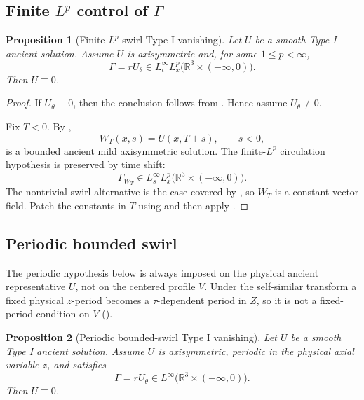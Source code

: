 \documentclass[11pt]{amsart}
\theoremstyle{plain}
\newtheorem{proposition}[proposition]{Proposition}
\theoremstyle{definition}
\theoremstyle{remark}
\numberwithin{equation}{section}
\begin{document}
\subsection{\texorpdfstring{Finite \(L^p\) control of \(\Gamma\)}
{Finite Lp control of Gamma}}

\begin{proposition}[Finite-\(L^p\) swirl Type I vanishing]
\label{p3:prop:lp-swirl-typeI}
Let \(U\) be a smooth Type I ancient solution.  Assume \(U\) is axisymmetric
and, for some \(1\le p<\infty\),
\[
   \Gamma=rU_\theta\in L_t^\infty L_x^p
   \bigl(\mathbb R^3\times(-\infty,0)\bigr).
\]
Then \(U\equiv0\).
\end{proposition}

\begin{proof}
If \(U_\theta\equiv0\), then the conclusion follows from
.  Hence assume \(U_\theta\not\equiv0\).

Fix \(T<0\).  By ,
\[
   W_T(x,s)=U(x,T+s),\qquad s<0,
\]
is a bounded ancient mild axisymmetric solution.  The finite-\(L^p\)
circulation hypothesis is preserved by time shift:
\[
   \Gamma_{W_T}\in L_s^\infty L_x^p
   \bigl(\mathbb R^3\times(-\infty,0)\bigr).
\]
The nontrivial-swirl alternative is the case covered by
, so \(W_T\) is a constant vector field.  Patch the constants
in \(T\) using  and then apply
.
\end{proof}

\subsection{Periodic bounded swirl}

The periodic hypothesis below is always imposed on the physical ancient
representative \(U\), not on the centered profile \(V\).  Under the
self-similar transform a fixed physical \(z\)-period becomes a
\(\tau\)-dependent period in \(Z\), so it is not a fixed-period condition on
\(V\) ().

\begin{proposition}[Periodic bounded-swirl Type I vanishing]
\label{p3:prop:periodic-swirl-typeI}
Let \(U\) be a smooth Type I ancient solution.  Assume \(U\) is axisymmetric,
periodic in the physical axial variable \(z\), and satisfies
\[
   \Gamma=rU_\theta\in L^\infty
   \bigl(\mathbb R^3\times(-\infty,0)\bigr).
\]
Then \(U\equiv0\).
\end{proposition}
\end{document}
